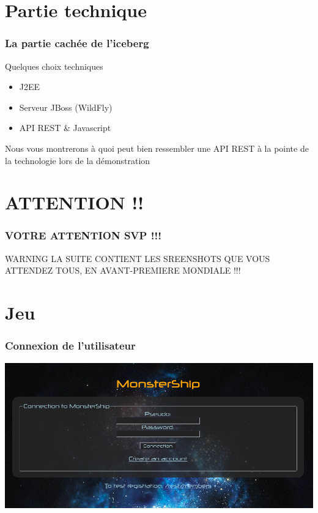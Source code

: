\documentclass{beamer}
\begin{document}
	\section{Partie technique}
		\begin{frame}
			\frametitle{La partie cachée de l'iceberg}
			\begin{block}{Quelques choix techniques}
				\begin{itemize}
					\item J2EE
					\item Serveur JBoss (WildFly)
					\item API REST \& Javascript
				\end{itemize}
				Nous vous montrerons à quoi peut bien ressembler une API REST à la pointe de la technologie lors de la démonstration
			\end{block}
		\end{frame}
	
	\section{ATTENTION !!}
		\begin{frame}
			\frametitle{VOTRE ATTENTION SVP !!!}
			\begin{alertblock}{WARNING}
				LA SUITE CONTIENT LES SREENSHOTS QUE VOUS ATTENDEZ TOUS, EN AVANT-PREMIERE MONDIALE !!!
			\end{alertblock}
		\end{frame}
		
	\section{Jeu}
		\begin{frame}
		\frametitle{Connexion de l'utilisateur}
			\includegraphics[width=1\textwidth]{images/connexion.png} 
		\end{frame}
		
\end{document}
